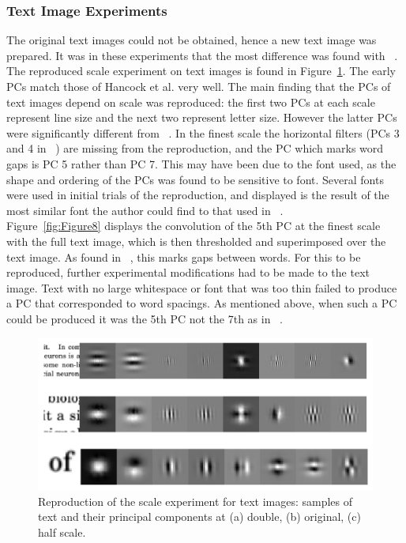 \subsubsection{Text Image Experiments}
The original text images could not be obtained, hence a new text image was prepared. It was in these experiments that the most difference was found with ~\cite{Hancock}.\\
The reproduced scale experiment on text images is found in Figure~\ref{fig:Figure7}. The early PCs match those of Hancock et al. very well. The main finding that the PCs of text images depend on scale was reproduced: the first two PCs at each scale represent line size and the next two represent letter size. However the latter PCs were significantly different from ~\cite{Hancock}. In the finest scale the horizontal filters (PCs 3 and 4 in ~\cite{Hancock}) are missing from the reproduction, and the PC which marks word gaps is PC 5 rather than PC 7. This may have been due to the font used, as the shape and ordering of the PCs was found to be sensitive to font. Several fonts were used in initial trials of the reproduction, and displayed is the result of the most similar font the author could find to that used in ~\cite{Hancock}.\\
Figure~\ref{fig:Figure8} displays the convolution of the 5th PC at the finest scale with the full text image, which is then thresholded and superimposed over the text image. As found in ~\cite{Hancock}, this marks gaps between words. For this to be reproduced, further experimental modifications had to be made to the text image. Text with no large whitespace or font that was too thin failed to produce a PC that corresponded to word spacings. As mentioned above, when such a PC could be produced it was the 5th PC not the 7th as in ~\cite{Hancock}. 
\begin{figure}
    \centering
    \includegraphics[scale=0.55]{figures/Figure7.png}
    \caption{Reproduction of the scale experiment for text images: samples of text and their principal components at (a) double, (b) original, (c) half scale.}
    \label{fig:Figure7}
\end{figure}
